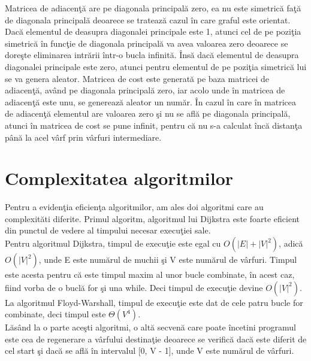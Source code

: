 \documentclass{article}
\begin{document}
Matricea de adiacen\c{t}\u{a} are pe diagonala principal\u{a} zero, ea nu este simetric\u{a} fa\c{t}\u{a} de diagonala principal\u{a} deoarece se trateaz\u{a} cazul \^{i}n care graful este orientat. Dac\u{a} elementul de deasupra diagonalei principale este 1, atunci cel de pe pozi\c{t}ia simetric\u{a} \^{i}n func\c{t}ie de diagonala principal\u{a} va avea valoarea zero deoarece se dore\c{s}te eliminarea intr\u{a}rii \^{i}ntr-o bucla infinit\u{a}. \^{I}ns\u{a} dac\u{a} elementul de deasupra diagonalei principale este zero, atunci pentru elementul de pe pozi\c{t}ia simetric\u{a} lui se va genera aleator. Matricea de cost este generat\u{a} pe baza matricei de adiacen\c{t}\u{a}, av\^{a}nd pe diagonala principal\u{a} zero, iar acolo unde \^{i}n matricea de adiacen\c{t}\u{a} este unu, se genereaz\u{a} aleator un num\u{a}r. \^{I}n cazul \^{i}n care \^{i}n matricea de adiacen\c{t}\u{a} elementul are valoarea zero \c{s}i nu se afl\u{a} pe diagonala principal\u{a}, atunci \^{i}n matricea de cost se pune infinit, pentru c\u{a} nu s-a calculat \^{i}nc\u{a} distan\c{t}a p\^{a}n\u{a} la acel v\^{a}rf prin v\^{a}rfuri intermediare.

\section{Complexitatea algoritmilor}
Pentru a eviden\c{t}ia eficien\c{t}a algoritmilor, am ales doi algoritmi care au complexit\u{a}ti diferite. Primul algoritm, algoritmul lui Dijkstra este foarte eficient din punctul de vedere al timpului necesar execu\c{t}iei sale.\\
Pentru algoritmul Dijkstra, timpul de execu\c{t}ie este egal cu $O(|E| + |V|^2)$, adic\u{a} $O(|V|^2)$, unde E este num\u{a}rul de muchii \c{s}i V este num\u{a}rul de v\^{a}rfuri. Timpul este acesta pentru c\u{a} este timpul maxim al unor bucle combinate, \^{i}n acest caz, fiind vorba de o bucl\u{a} for \c{s}i una while. Deci timpul de execu\c{t}ie devine $O(|V|^2)$.\\
La algoritmul Floyd-Warshall, timpul de execu\c{t}ie este dat de cele patru bucle for combinate, deci timpul este $\Theta(V^4)$.\\
L\u{a}s\^{a}nd la o parte ace\c{s}ti algoritmi, o alt\u{a} secven\u{a} care poate \^{i}ncetini programul este cea de regenerare a v\^{a}rfului destina\c{t}ie deoarece se verific\u{a} dac\u{a} este diferit de cel start \c{s}i dac\u{a} se afl\u{a} \^{i}n intervalul [0, V - 1], unde V este num\u{a}rul de v\^{a}rfuri.
\end{document}
